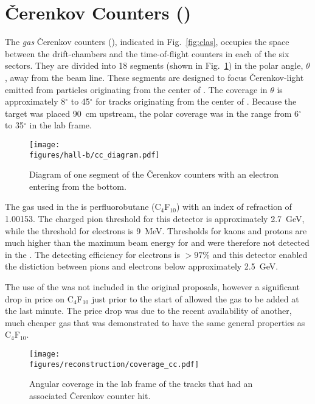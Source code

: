 \section{\label{sec:clas.cc}\texorpdfstring{\v{C}}{C}erenkov Counters ()}

The \emph{gas} \v{C}erenkov counters (), indicated in Fig.~\ref{fig:clas}, occupies the space between the drift-chambers and the time-of-flight counters in each of the six sectors. They are divided into 18 segments (shown in Fig.~\ref{fig:clas.cc}) in the polar angle, $\theta$, away from the beam line. These segments are designed to focus \v{C}erenkov-light emitted from particles originating from the center of . The coverage in $\theta$ is approximately 8$^\circ$ to 45$^\circ$ for tracks originating from the center of . Because the target was placed 90~cm upstream, the polar coverage was in the range from 6$^\circ$ to 35$^\circ$ in the lab frame.

\begin{figure}\begin{center}
\texttt{[image: \\figures/hall-b/cc\_diagram.pdf]}
\caption[\v{C}erenkov Detector Segment Diagram]{\label{fig:clas.cc}Diagram of one segment of the \v{C}erenkov counters with an electron entering from the bottom.}
\end{center}\end{figure}

The gas used in the  is perfluorobutane (C$_4$F$_{10}$) with an index of refraction of 1.00153. The charged pion threshold for this detector is approximately 2.7~GeV, while the threshold for electrons is 9~MeV. Thresholds for kaons and protons are much higher than the maximum beam energy for  and were therefore not detected in the . The detecting efficiency for electrons is $> 97\%$ and this detector enabled the distiction between pions and electrons below approximately 2.5~GeV.

The use of the  was not included in the original proposals, however a significant drop in price on C$_4$F$_{10}$ just prior to the start of  allowed the gas to be added at the last minute. The price drop was due to the recent availability of another, much cheaper gas that was demonstrated to have the same general properties as C$_4$F$_{10}$.

\begin{figure}\begin{center}
\texttt{[image: \\figures/reconstruction/coverage\_cc.pdf]}
\caption[\v{C}erenkov Counter Angular Coverage]{\label{fig:clas.cc.coverage}{}Angular coverage in the lab frame of the tracks that had an associated \v{C}erenkov counter hit.}
\end{center}\end{figure}
